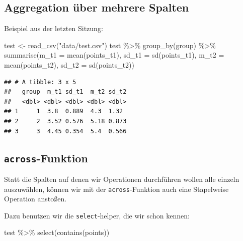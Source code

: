 \documentclass[
]{book}
\newenvironment{Shaded}{\begin{snugshade}}{\end{snugshade}}
\newcommand{\AttributeTok}[1]{\textcolor[rgb]{0.77,0.63,0.00}{#1}}
\newcommand{\FunctionTok}[1]{\textcolor[rgb]{0.00,0.00,0.00}{#1}}
\newcommand{\NormalTok}[1]{#1}
\newcommand{\OtherTok}[1]{\textcolor[rgb]{0.56,0.35,0.01}{#1}}
\newcommand{\SpecialCharTok}[1]{\textcolor[rgb]{0.00,0.00,0.00}{#1}}
\newcommand{\StringTok}[1]{\textcolor[rgb]{0.31,0.60,0.02}{#1}}
\begin{document}
\hypertarget{aggregation-uxfcber-mehrere-spalten}{%
\subsection{Aggregation über mehrere Spalten}\label{aggregation-uxfcber-mehrere-spalten}}

Beispiel aus der letzten Sitzung:

\begin{Shaded}
\begin{Highlighting}[]
\NormalTok{test }\OtherTok{\textless{}{-}} \FunctionTok{read\_csv}\NormalTok{(}\StringTok{"data/test.csv"}\NormalTok{)}
\NormalTok{test }\SpecialCharTok{\%\textgreater{}\%}
  \FunctionTok{group\_by}\NormalTok{(group) }\SpecialCharTok{\%\textgreater{}\%} 
  \FunctionTok{summarise}\NormalTok{(}\AttributeTok{m\_t1 =} \FunctionTok{mean}\NormalTok{(points\_t1),}
            \AttributeTok{sd\_t1 =} \FunctionTok{sd}\NormalTok{(points\_t1),}
            \AttributeTok{m\_t2 =} \FunctionTok{mean}\NormalTok{(points\_t2),}
            \AttributeTok{sd\_t2 =} \FunctionTok{sd}\NormalTok{(points\_t2))}
\end{Highlighting}
\end{Shaded}

\begin{verbatim}
## # A tibble: 3 x 5
##   group  m_t1 sd_t1  m_t2 sd_t2
##   <dbl> <dbl> <dbl> <dbl> <dbl>
## 1     1  3.8  0.889  4.3  1.32 
## 2     2  3.52 0.576  5.18 0.873
## 3     3  4.45 0.354  5.4  0.566
\end{verbatim}

\hypertarget{across-funktion}{%
\subsection{\texorpdfstring{\texttt{across}-Funktion}{across-Funktion}}\label{across-funktion}}

Statt die Spalten auf denen wir Operationen durchführen wollen alle einzeln auszuwählen, können wir mit der \texttt{across}-Funktion auch eine Stapelweise Operation anstoßen.

Dazu benutzen wir die \texttt{select}-helper, die wir schon kennen:

\begin{Shaded}
\begin{Highlighting}[]
\NormalTok{test }\SpecialCharTok{\%\textgreater{}\%} 
  \FunctionTok{select}\NormalTok{(}\FunctionTok{contains}\NormalTok{(}\StringTok{\textquotesingle{}points\textquotesingle{}}\NormalTok{))}
\end{Highlighting}
\end{Shaded}
\end{document}
